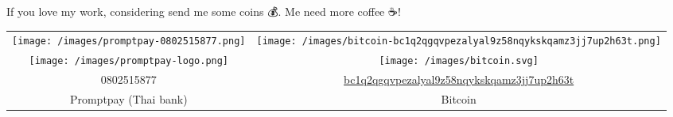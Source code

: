 

If you love my work, considering send me some coins 💰. Me need more coffee ☕!

\begin{tabular}{c c}
  {\texttt{[image: /images/promptpay-0802515877.png]}}&
  {\texttt{[image: /images/bitcoin-bc1q2qgqvpezalyal9z58nqykskqamz3jj7up2h63t.png]}}\\

  {\texttt{[image: /images/promptpay-logo.png]}}&
  {\texttt{[image: /images/bitcoin.svg]}}\\

  {0802515877}&
  \href{https://blockstream.info/address/bc1q2qgqvpezalyal9z58nqykskqamz3jj7up2h63t}
  {{bc1q2qgqvpezalyal9z58nqykskqamz3jj7up2h63t}}\\

  {Promptpay (Thai bank)}&
  {Bitcoin}\\
\end{tabular}


